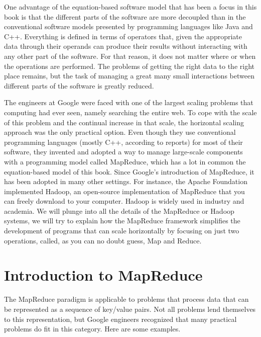 One advantage of the equation-based software model
that has been a focus in this book is that the
different parts of the software are more decoupled 
than in the conventional software models presented
by programming languages like Java and C++.
Everything is defined in terms of operators
that, given the appropriate data through their operands
can produce their results without 
interacting with any other part of the software.
For that reason, it does not matter where or when 
the operations are performed.
The problems of getting the right data to the right place
remains, but the task of managing a great many small interactions
between different parts of the software is greatly reduced.

The engineers at Google were faced with one of the largest
scaling problems that computing had ever seen, 
namely searching the entire web.
To cope with the scale of this problem and the continual
increase in that scale,
the horizontal scaling approach was the only practical option.  
Even though they use conventional programming languages
(mostly C++, according to reports) for most of their software,
they invented and adopted a way to manage large-scale components
with a programming model called MapReduce, 
which has a lot in common the equation-based model of this book.  
Since Google's introduction of MapReduce, 
it has been adopted in many other settings.  For
instance, the Apache Foundation implemented Hadoop, an
open-source implementation of MapReduce that you can freely
download to your computer.  
Hadoop is widely used in industry and academia.  
We will plunge into all the details of the
MapReduce or Hadoop systems, we will try to
explain how the MapReduce framework simplifies the
development of programs that can scale horizontally by
focusing on just two operations, called, as you can
no doubt guess, Map and Reduce.

\section{Introduction to MapReduce}

The MapReduce paradigm is applicable to problems that process
data that can be represented as a sequence of key/value pairs.  
Not all problems lend themselves to this representation,
but Google engineers recognized that many practical
problems do fit in this category.  Here are some examples.

